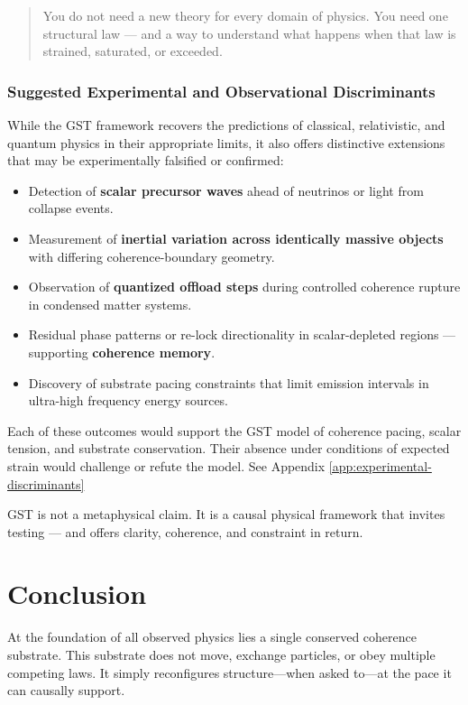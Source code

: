 \documentclass[entropy,article,submit,pdftex,moreauthors]{Definitions/mdpi}
\begin{document}
\begin{quote}
You do not need a new theory for every domain of physics. You need one structural law — and a way to understand what happens when that law is strained, saturated, or exceeded.
\end{quote}

\subsubsection*{Suggested Experimental and Observational Discriminants}

While the GST framework recovers the predictions of classical, relativistic, and quantum physics in their appropriate limits, it also offers distinctive extensions that may be experimentally falsified or confirmed:

\begin{itemize}
    \item Detection of \textbf{scalar precursor waves} ahead of neutrinos or light from collapse events.
    \item Measurement of \textbf{inertial variation across identically massive objects} with differing coherence-boundary geometry.
    \item Observation of \textbf{quantized offload steps} during controlled coherence rupture in condensed matter systems.
    \item Residual phase patterns or re-lock directionality in scalar-depleted regions — supporting \textbf{coherence memory}.
    \item Discovery of substrate pacing constraints that limit emission intervals in ultra-high frequency energy sources.
\end{itemize}

Each of these outcomes would support the GST model of coherence pacing, scalar tension, and substrate conservation. Their absence under conditions of expected strain would challenge or refute the model.  See Appendix \ref{app:experimental-discriminants}

\vspace{1em}
GST is not a metaphysical claim. It is a causal physical framework that invites testing — and offers clarity, coherence, and constraint in return.

\section{Conclusion}
At the foundation of all observed physics lies a single conserved coherence substrate. This substrate does not move, exchange particles, or obey multiple competing laws. It simply reconfigures structure—when asked to—at the pace it can causally support.
\end{document}
